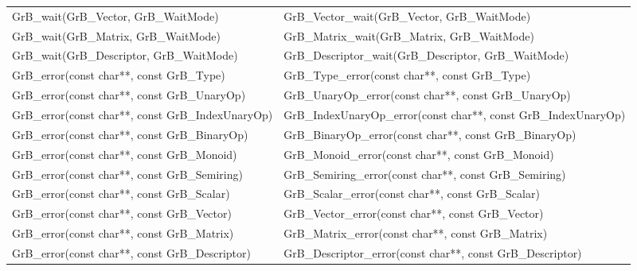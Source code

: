 \begin{table}[htb]
{\begin{tabular}{l|l}
{\sf GrB\_wait(GrB\_Vector, GrB\_WaitMode)}			& {\sf GrB\_Vector\_wait(GrB\_Vector, GrB\_WaitMode)} \\
{\sf GrB\_wait(GrB\_Matrix, GrB\_WaitMode)}			& {\sf GrB\_Matrix\_wait(GrB\_Matrix, GrB\_WaitMode)} \\
{\sf GrB\_wait(GrB\_Descriptor, GrB\_WaitMode)}			& {\sf GrB\_Descriptor\_wait(GrB\_Descriptor, GrB\_WaitMode)} \\ 
\hline
{\sf GrB\_error(const char**, const GrB\_Type)}			& {\sf GrB\_Type\_error(const char**, const GrB\_Type)} \\
{\sf GrB\_error(const char**, const GrB\_UnaryOp)}		& {\sf GrB\_UnaryOp\_error(const char**, const GrB\_UnaryOp)} \\
{\sf GrB\_error(const char**, const GrB\_IndexUnaryOp)}		& {\sf GrB\_IndexUnaryOp\_error(const char**, const GrB\_IndexUnaryOp)} \\
{\sf GrB\_error(const char**, const GrB\_BinaryOp)}		& {\sf GrB\_BinaryOp\_error(const char**, const GrB\_BinaryOp)} \\
{\sf GrB\_error(const char**, const GrB\_Monoid)}		& {\sf GrB\_Monoid\_error(const char**, const GrB\_Monoid)} \\
{\sf GrB\_error(const char**, const GrB\_Semiring)}		& {\sf GrB\_Semiring\_error(const char**, const GrB\_Semiring)} \\
{\sf GrB\_error(const char**, const GrB\_Scalar)}		& {\sf GrB\_Scalar\_error(const char**, const GrB\_Scalar)} \\
{\sf GrB\_error(const char**, const GrB\_Vector)}		& {\sf GrB\_Vector\_error(const char**, const GrB\_Vector)} \\
{\sf GrB\_error(const char**, const GrB\_Matrix)}		& {\sf GrB\_Matrix\_error(const char**, const GrB\_Matrix)} \\
{\sf GrB\_error(const char**, const GrB\_Descriptor)}		& {\sf GrB\_Descriptor\_error(const char**, const GrB\_Descriptor)} \\ 
\hline
\end{tabular}
}
\label{Tab:NonPolymorphic4}
\end{table}

